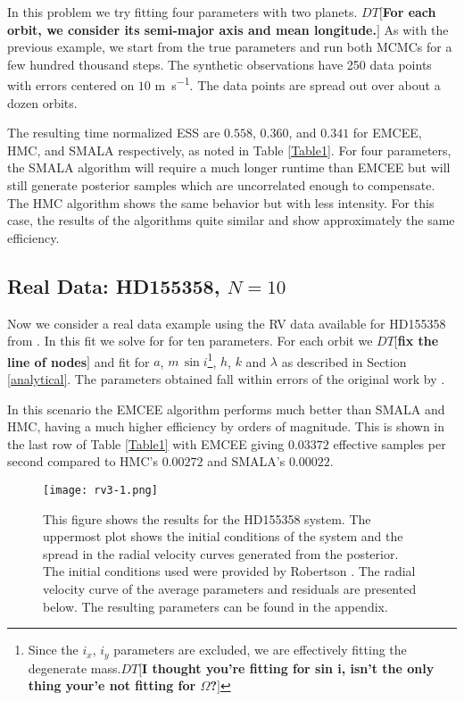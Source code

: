 \documentclass{aa}
\def\memodt#1{\color{green}$DT[${\bf #1}$]$ \color{black}}
\begin{document}
In this problem we try fitting four parameters with two planets.
\memodt{For each orbit, we consider its semi-major axis and mean longitude.}
As with the previous example, we start from the true parameters and run both MCMCs for a few hundred thousand steps. 
The synthetic observations have 250 data points with errors centered on $10$ \si{\metre\per\second}. 
The data points are spread out over about a dozen orbits.

The resulting time normalized ESS are $0.558$, $0.360$, and $0.341$ for EMCEE, HMC, and SMALA respectively, as noted in Table \ref{Table1}. 
For four parameters, the SMALA algorithm will require a much longer runtime than EMCEE but will still generate posterior samples which are uncorrelated enough to compensate. 
The HMC algorithm shows the same behavior but with less intensity. For this case, the results of the algorithms quite similar and show approximately the same efficiency.


\subsection{Real Data: HD155358, $N=10$}

Now we consider a real data example using the RV data available for HD155358 from \cite{Robertson2012}. 
In this fit we solve for for ten parameters. For each orbit we \memodt{fix the line of nodes} and fit for $a$, $m\, \sin i$\footnote{Since the $i_x$, $i_y$ parameters are excluded, we are effectively fitting the degenerate mass.\memodt{I thought you're fitting for sin i, isn't the only thing your'e not fitting for $\Omega$?}}, $h$, $k$ and $\lambda$ as described in Section \ref{analytical}. 
The parameters obtained fall within errors of the original work by \cite{Robertson2012}.

In this scenario the EMCEE algorithm performs much better than SMALA and HMC, having a much higher efficiency by orders of magnitude. 
This is shown in the last row of Table \ref{Table1} with EMCEE giving $0.03372$ effective samples per second compared to HMC's $0.00272$ and SMALA's $0.00022$.

\begin{figure}
\centering
\texttt{[image: rv3-1.png]}
   \caption{This figure shows the results for the HD155358 system. 
The uppermost plot shows the initial conditions of the system and the spread in the radial velocity curves generated from the posterior. 
The initial conditions used were provided by Robertson \cite{Robertson2012}. 
The radial velocity curve of the average parameters and residuals are presented below. 
The resulting parameters can be found in the appendix.}
      \label{FigHD}
\end{figure}
\end{document}
